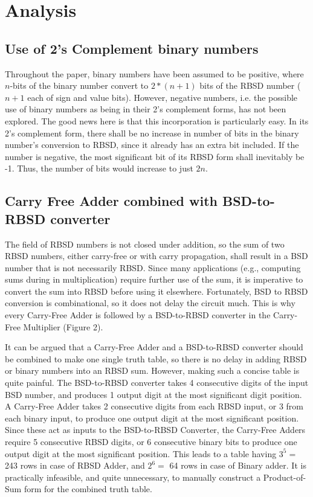 \documentclass[conference]{IEEEtran}
\begin{document}
\section{Analysis}

\subsection{Use of 2's Complement binary numbers}

Throughout the paper, binary numbers have been assumed to be positive, where $n$-bits of the binary number convert to $2*(n+1)$ bits of the RBSD number ($n+1$ each of sign and value bits). However, negative numbers, i.e. the possible use of binary numbers as being in their 2's complement forms, has not been explored. The good news here is that this incorporation is particularly easy. In its 2's complement form, there shall be no increase in number of bits in the binary number's conversion to RBSD, since it already has an extra bit included. If the number is negative, the most significant bit of its RBSD form shall inevitably be -1. Thus, the number of bits would increase to just $2n$.

\subsection{Carry Free Adder combined with BSD-to-RBSD converter}

The field of RBSD numbers is not closed under addition, so the sum of two RBSD numbers, either carry-free or with carry propagation, shall result in a BSD number that is not necessarily RBSD. Since many applications (e.g., computing sums during in multiplication) require further use of the sum, it is imperative to convert the sum into RBSD before using it elsewhere. Fortunately, BSD to RBSD conversion is combinational, so it does not delay the circuit much. This is why every Carry-Free Adder is followed by a BSD-to-RBSD converter in the Carry-Free Multiplier (Figure 2).

It can be argued that a Carry-Free Adder and a BSD-to-RBSD converter should be combined to make one single truth table, so there is no delay in adding RBSD or binary numbers into an RBSD sum. However, making such a concise table is quite painful. The BSD-to-RBSD converter takes 4 consecutive digits of the input BSD number, and produces 1 output digit at the most significant digit position. A Carry-Free Adder takes 2 consecutive digits from each RBSD input, or 3 from each binary input, to produce one output digit at the most significant position. Since these act as inputs to the BSD-to-RBSD Converter, the Carry-Free Adders require 5 consecutive RBSD digits, or 6 consecutive binary bits to produce one output digit at the most significant position. This leads to a table having $3^5 =$ 243 rows in case of RBSD Adder, and $2^6 =$ 64 rows in case of Binary adder. It is practically infeasible, and quite unnecessary, to manually construct a Product-of-Sum form for the combined truth table.
\end{document}
